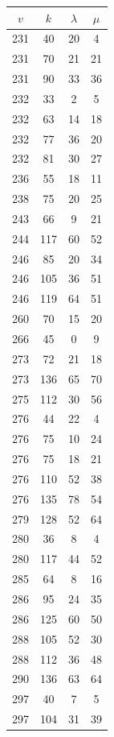 \documentclass[12pt]{amsproc} %
\theoremstyle{definition}\newtheorem{defn}[thm]{Definition}
\theoremstyle{definition}\newtheorem{rem}[thm]{Remark}
\theoremstyle{definition}\newtheorem{ex}[thm]{Example}
\begin{document}
\begin{table}[ht]
\begin{minipage}{0.25\textwidth}
\begin{tabular}{c|c|c|c}
        \end{tabular}
    \end{minipage}
    \hfill
    \begin{minipage}{0.25\textwidth}
        \centering
        \begin{tabular}{c|c|c|c}
            $v$ & $k$ & $\lambda$ & $\mu$ \\ 
            \hline
		231 & 40 & 20 & 4 \\ 
		231 & 70 & 21 & 21 \\ 
		231 & 90 & 33 & 36 \\ 
		232 & 33 & 2 & 5 \\ 
		232 & 63 & 14 & 18 \\ 
		232 & 77 & 36 & 20 \\ 
		232 & 81 & 30 & 27 \\ 
		236 & 55 & 18 & 11 \\ 
		238 & 75 & 20 & 25 \\ 
		243 & 66 & 9 & 21 \\ 
		244 & 117 & 60 & 52 \\ 
		246 & 85 & 20 & 34 \\ 
		246 & 105 & 36 & 51 \\ 
		246 & 119 & 64 & 51 \\ 
		260 & 70 & 15 & 20 \\ 
		266 & 45 & 0 & 9 \\ 
		273 & 72 & 21 & 18 \\ 
		273 & 136 & 65 & 70 \\ 
		275 & 112 & 30 & 56 \\ 
		276 & 44 & 22 & 4 \\ 
		276 & 75 & 10 & 24 \\ 
		276 & 75 & 18 & 21 \\ 
		276 & 110 & 52 & 38 \\ 
		276 & 135 & 78 & 54 \\ 
		279 & 128 & 52 & 64 \\ 
		280 & 36 & 8 & 4 \\ 
		280 & 117 & 44 & 52 \\ 
		285 & 64 & 8 & 16 \\ 
		286 & 95 & 24 & 35 \\ 
		286 & 125 & 60 & 50 \\ 
		288 & 105 & 52 & 30 \\ 
		288 & 112 & 36 & 48 \\ 
		290 & 136 & 63 & 64 \\ 
		297 & 40 & 7 & 5 \\ 
		297 & 104 & 31 & 39 \\ 
        \end{tabular}
    \end{minipage}
\end{table}
\end{document}

